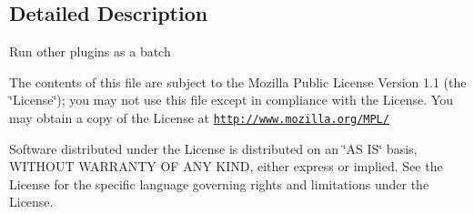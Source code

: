 \subsection{Detailed Description}
Run other plugins as a batch

The contents of this file are subject to the Mozilla Public License Version 1.1 (the \char`\"{}License\char`\"{}); you may not use this file except in compliance with the License. You may obtain a copy of the License at \href{http://www.mozilla.org/MPL/}{\tt http://www.mozilla.org/MPL/}

Software distributed under the License is distributed on an \char`\"{}AS IS\char`\"{} basis, WITHOUT WARRANTY OF ANY KIND, either express or implied. See the License for the specific language governing rights and limitations under the License. 